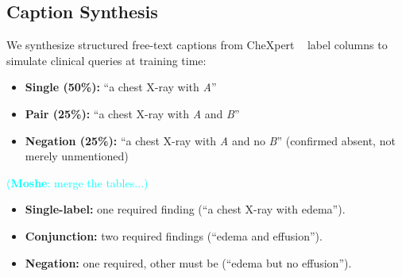 \documentclass[10pt,twocolumn,letterpaper]{article}
\newcommand\mk[1]{\textcolor{cyan}{(\textbf{Moshe}: #1)}}
\begin{document}
\subsection{Caption Synthesis}
We synthesize structured free-text captions from CheXpert ~\cite{irvin2019chexpert} label columns to simulate
clinical queries at training time:
\begin{itemize}
    \item \textbf{Single (50\%):} ``a chest X-ray with \textit{A}''
    \item \textbf{Pair (25\%):} ``a chest X-ray with \textit{A} and \textit{B}''
    \item \textbf{Negation (25\%):} ``a chest X-ray with \textit{A} and no \textit{B}'' (confirmed absent, not merely unmentioned)
\end{itemize}
\mk{merge the tables...}
\begin{itemize}
    \item \textbf{Single-label:} one required finding (``a chest X-ray with edema'').
    \item \textbf{Conjunction:} two required findings (``edema and effusion'').
    \item \textbf{Negation:} one required, other must be  (``edema but no effusion'').
\end{itemize}
\end{document}
